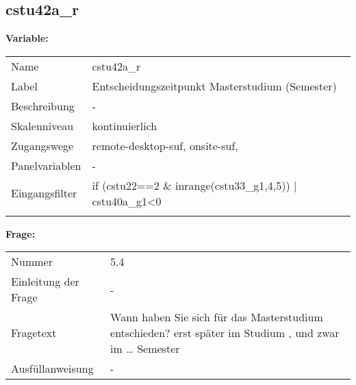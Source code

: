 	
	
	\subsection{cstu42a\_r}
	\label{subSection:cstu42a_r}

	\noindent\textbf{Variable:}\\
		\begin{tabular}{lL{11.3cm}}
			\label{tableVariable:cstu42a_r}
			Name & cstu42a\_r \\
			Label & Entscheidungszeitpunkt Masterstudium (Semester) \\
			Beschreibung & - \\
			Skalenniveau & kontinuierlich \\
			Zugangswege &
				remote-desktop-suf,
				onsite-suf,
 \\
			Panelvariablen & -
			 \\
			Eingangsfilter & if (cstu22==2 \& inrange(cstu33\_g1,4,5)) | cstu40a\_g1\textless{}0 \\
 \\
		\end{tabular}

		\vspace*{1 cm}
		\noindent\textbf{Frage:}\\
		\begin{tabular}{lL{11.3cm}}
			\label{tableQuestion:cstu42a_r}
			Nummer & 5.4 \\
			Einleitung der Frage & - \\
			Fragetext & Wann haben Sie sich für das Masterstudium entschieden?
erst später im Studium , und zwar im … Semester \\
			Ausfüllanweisung & - \\
		\end{tabular}




